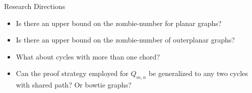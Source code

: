 \begin{frame}{Research Directions}

\begin{itemize}
  \item<1->Is there an upper bound on the zombie-number for planar graphs?
  \item<2->Is there an upper bound on the zombie-number of outerplanar graphs?
  \item<3->What about cycles with more than one chord?
  \item<4->Can the proof strategy employed for $Q_{m,n}$ be generalized to any two cycles with shared path? Or bowtie graphs?
\end{itemize}

\end{frame}
